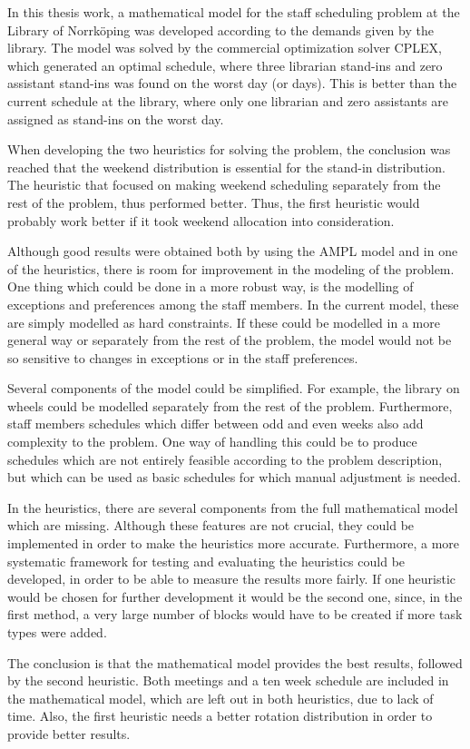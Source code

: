 In this thesis work, a mathematical model for the staff scheduling problem at the Library of Norrköping was developed according to the demands given by the library. The model was solved by the commercial optimization solver CPLEX, which generated an optimal schedule, where three librarian stand-ins and zero assistant stand-ins was found on the worst day (or days). This is better than the current schedule at the library, where only one librarian and zero assistants are assigned as stand-ins on the worst day.

When developing the two heuristics for solving the problem, the conclusion was reached that the weekend distribution is essential for the stand-in distribution. The heuristic that focused on making weekend scheduling separately from the rest of the problem, thus performed better. Thus, the first heuristic would probably work better if it took weekend allocation into consideration.

Although good results were obtained both by using the AMPL model and in one of the heuristics, there is room for improvement in the modeling of the problem. One thing which could be done in a more robust way, is the modelling of exceptions and preferences among the staff members. In the current model, these are simply modelled as hard constraints. If these could be modelled in a more general way or separately from the rest of the problem, the model would not be so sensitive to changes in exceptions or in the staff preferences.

Several components of the model could be simplified. For example, the library on wheels could be modelled separately from the rest of the problem. Furthermore, staff members schedules which differ between odd and even weeks also add complexity to the problem. One way of handling this could be to produce schedules which are not entirely feasible according to the problem description, but which can be used as basic schedules for which manual adjustment is needed.

In the heuristics, there are several components from the full mathematical model which are missing. Although these features are not crucial, they could be implemented in order to make the heuristics more accurate. Furthermore, a more systematic framework for testing and evaluating the heuristics could be developed, in order to be able to measure the results more fairly. If one heuristic would be chosen for further development it would be the second one, since, in the first method, a very large number of blocks would have to be created if more task types were added.

The conclusion is that the mathematical model provides the best results, followed by the second heuristic. Both meetings and a ten week schedule are included in the mathematical model, which are left out in both heuristics, due to lack of time. Also, the first heuristic needs a better rotation distribution in order to provide better results.

